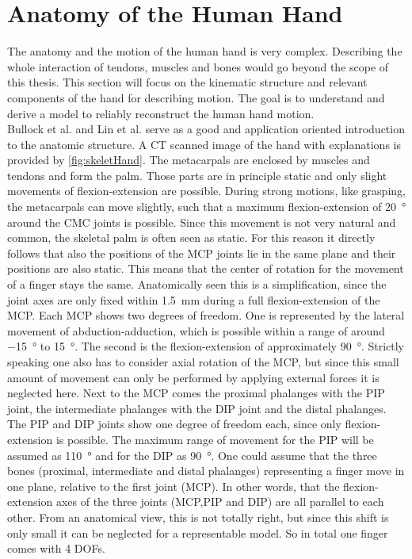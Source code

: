 \section{Anatomy of the Human Hand} \label{sec:anatomy}
The anatomy and the motion of the human hand is very complex. Describing the whole interaction of tendons, muscles and bones would go beyond the scope of this thesis. This section will focus on the kinematic structure and relevant components of the hand for describing motion. The goal is to understand and derive a model to reliably reconstruct the human hand motion.\\
Bullock et al. \cite{bullock2012assessing} and Lin et al. \cite{lin2000modeling} serve as a good and application oriented introduction to the anatomic structure. A \ac{CT} scanned image of the hand with explanations is provided by \ref{fig:skeletHand}. The metacarpals are enclosed by muscles and tendons and form the palm. Those parts are in principle static and only slight movements of flexion-extension are possible. During strong motions, like grasping, the metacarpals can move slightly, such that a maximum flexion-extension of \SI{20}{\degree} around the \ac{CMC} joints is possible. Since this movement is not very natural and common, the skeletal palm is often seen as static. For this reason it directly follows that also the positions of the \ac{MCP} joints lie in the same plane and their positions are also static. This means that the center of rotation for the movement of a finger stays the same. Anatomically seen this is a simplification, since the joint axes are only fixed within \SI{1.5}{mm} during a full flexion-extension of the \ac{MCP}. 
Each \ac{MCP} shows two degrees of freedom. One is represented by the lateral movement of abduction-adduction, which is possible within a range of around \SI{-15}{\degree} to \SI{+15}{\degree}. The second is the flexion-extension of approximately \SI{90}{\degree}. Strictly speaking one also has to consider axial rotation of the MCP, but since this small amount of movement can only be performed by applying external forces it is neglected here. Next to the \ac{MCP} comes the proximal phalanges with the \ac{PIP} joint, the intermediate phalanges with the \ac{DIP} joint and the distal phalanges. The \ac{PIP} and \ac{DIP} joints show one degree of freedom each, since only flexion-extension is possible. The maximum range of movement for the \ac{PIP} will be assumed as \SI{110}{\degree} and for the \ac{DIP} as \SI{90}{\degree}. One could assume that the three bones (proximal, intermediate and distal phalanges) representing a finger move in one plane, relative to the first joint (\ac{MCP}). In other words, that the flexion-extension axes of the three joints (\ac{MCP},\ac{PIP} and \ac{DIP}) are all parallel to each other. From an anatomical view, this is not totally right, but since this shift is only small it can be neglected for a representable model. So in total one finger comes with 4 \acp{DOF}. 


